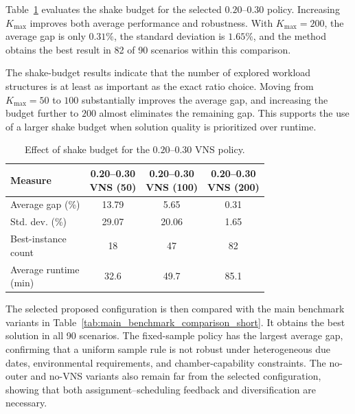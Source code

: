 \documentclass[11pt]{article}
\newcommand{\compacttable}{%
  \footnotesize
  \setlength{\tabcolsep}{2.8pt}%
  \renewcommand{\arraystretch}{0.86}%
}
\begin{document}
Table~\ref{tab:vns_budget_comparison_short} evaluates the shake budget for the selected \(0.20\)--\(0.30\) policy. Increasing \(K_{\max}\) improves both average performance and robustness. With \(K_{\max}=200\), the average gap is only \(0.31\%\), the standard deviation is \(1.65\%\), and the method obtains the best result in 82 of 90 scenarios within this comparison.

The shake-budget results indicate that the number of explored workload structures is at least as important as the exact ratio choice. Moving from \(K_{\max}=50\) to \(100\) substantially improves the average gap, and increasing the budget further to \(200\) almost eliminates the remaining gap. This supports the use of a larger shake budget when solution quality is prioritized over runtime.

\begin{table}[H]
\centering
\caption{Effect of shake budget for the \(0.20\)--\(0.30\) VNS policy.}
\label{tab:vns_budget_comparison_short}
\compacttable
\begin{tabular}{lccc}
\hline
\textbf{Measure}
& \shortstack{\textbf{0.20--0.30}\\\textbf{VNS (50)}}
& \shortstack{\textbf{0.20--0.30}\\\textbf{VNS (100)}}
& \shortstack{\textbf{0.20--0.30}\\\textbf{VNS (200)}} \\
\hline
Average gap (\%) & 13.79 & 5.65 & 0.31 \\
Std. dev. (\%) & 29.07 & 20.06 & 1.65 \\
\shortstack[l]{Best-instance\\count} & 18 & 47 & 82 \\
\shortstack[l]{Average runtime\\(min)} & 32.6 & 49.7 & 85.1 \\
\hline
\end{tabular}
\end{table}

The selected proposed configuration is then compared with the main benchmark variants in Table~\ref{tab:main_benchmark_comparison_short}. It obtains the best solution in all 90 scenarios. The fixed-sample policy has the largest average gap, confirming that a uniform sample rule is not robust under heterogeneous due dates, environmental requirements, and chamber-capability constraints. The no-outer and no-VNS variants also remain far from the selected configuration, showing that both assignment--scheduling feedback and diversification are necessary.
\end{document}
